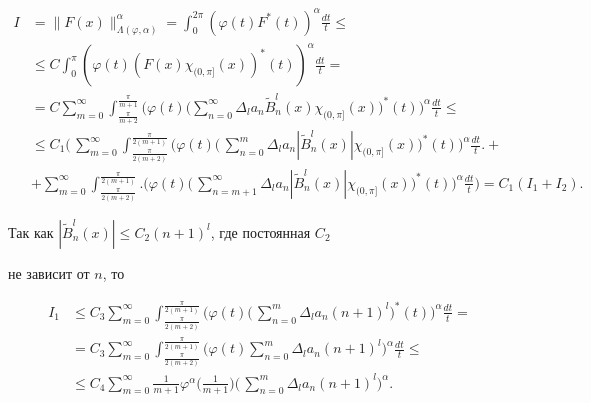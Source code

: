 \begin{align*}


I&=\|F(x)\|^\alpha_{\Lambda(\varphi,\alpha)}=\int^{2\pi}_0


(\varphi(t)F^*(t))^\alpha\frac{dt}{t}\le \\


&\le C\int^\pi_0


(\varphi(t)(F(x)\chi_{(0,\pi]}(x))^*(t))^\alpha\frac{dt}{t}= \\


&= C\sum^\infty_{m=0}\int^{\frac{\pi}{m+1}}_{\frac{\pi}{m+2}}


\biggl(\varphi(t)\biggl(\sum^\infty_{n=0}\Delta_l a_n


\widetilde B^l_n(x)\chi_{(0,\pi]}(x)\biggr)^*(t)\biggr)^\alpha


\frac{dt}{t}\le \\


&\le C_1\biggl(\,\sum^\infty_{m=0}


\int^{\frac{\pi}{2(m+1)}}_{\frac{\pi}{2(m+2)}}\biggl(\varphi(t)


\biggl(\,\sum^m_{n=0}\Delta_l a_n|\widetilde B^l_n(x)|


\chi_{(0,\pi]}(x)\biggr)^*(t)\biggr)^\alpha\frac{dt}{t}\biggr.+\\


&+\sum^\infty_{m=0}


\int^{\frac{\pi}{2(m+1)}}_{\frac{\pi}{2(m+2)}}


\biggl.\biggl(\varphi(t)\biggl(\,\sum^\infty_{n=m+1}


\Delta_l a_n|\widetilde B^l_n(x)|


\chi_{(0,\pi]}(x)\biggr)^*(t)\biggr)^\alpha\frac{dt}{t}\biggr)=


C_1(I_1+I_2).


\end{align*}


Так как $|\widetilde B^l_n(x)|\le C_2(n+1)^l$, где постоянная $C_2$


не зависит от $n$, то


\begin{align*}


I_1&\le C_3\sum^\infty_{m=0}


\int^{\frac{\pi}{2(m+1)}}_{\frac{\pi}{2(m+2)}}


\biggl(\varphi(t)\biggl(\,\sum^m_{n=0}\Delta_l a_n(n+1)^l


\biggr)^*(t)\biggr)^\alpha\frac{dt}{t}=\\


&= C_3\sum^\infty_{m=0}


\int^{\frac{\pi}{2(m+1)}}_{\frac{\pi}{2(m+2)}}


\biggl(\varphi(t)\sum^m_{n=0}\Delta_l a_n(n+1)^l\biggr)^\alpha


\frac{dt}{t} \le \\


& \le C_4\sum^\infty_{m=0}\frac{1}{m+1}\varphi^\alpha


\biggl(\frac{1}{m+1} \biggr)\biggl(\,\sum^m_{n=0}


\Delta_l a_n(n+1)^l\biggr)^\alpha.


\end{align*}


